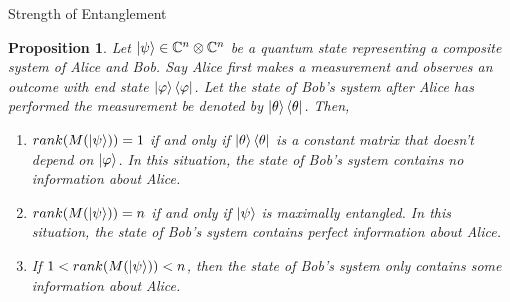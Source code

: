 \documentclass[handout, 10 pt]{beamer}
\newtheorem{prop}{Proposition}
\begin{document}
\begin{frame}{Strength of Entanglement}
    \begin{prop}
\label{entanglement-rank}
Let $\ket{\psi} \in \mathbb{C}^n \otimes \mathbb{C}^{n}$ be a quantum state representing a composite system of Alice and Bob. Say Alice first makes a measurement and observes an outcome with end state $\ket{\varphi}\bra{\varphi}$. Let the state of Bob's system after Alice has performed the measurement be denoted by $\ket{\theta}\bra{\theta}$. Then,
\pause
\begin{enumerate}
    \item $rank(M(\ket{\psi}))=1$ if and only if $\ket{\theta}\bra{\theta}$ is a constant matrix that doesn't depend on $\ket{\varphi}$. In this situation, the state of Bob's system contains no information about Alice.
    \pause
    \item $rank(M(\ket{\psi}))=n$ if and only if $\ket{\psi}$ is maximally entangled. In this situation, the state of Bob's system contains perfect information about Alice.
    \pause
    \item If $1<rank(M(\ket{\psi}))<n$, then the state of Bob's system only contains some information about Alice.
\end{enumerate}
\end{prop}
\end{frame}
\end{document}
